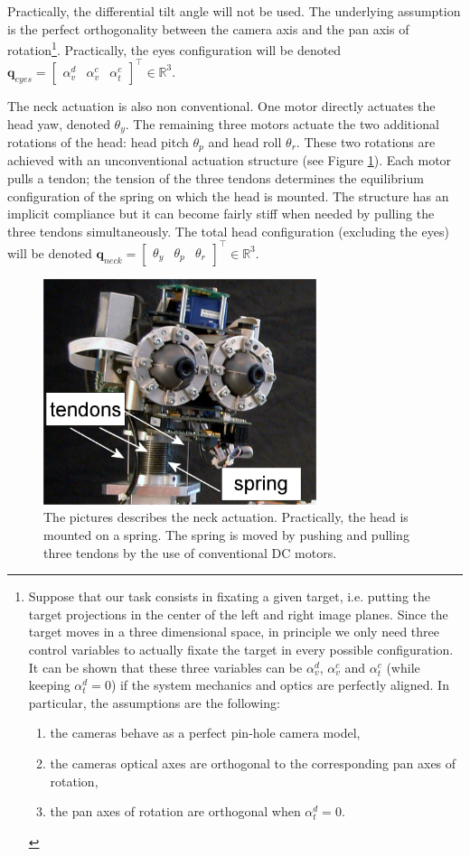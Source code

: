 Practically, the differential tilt angle will not be used. The underlying assumption is the perfect orthogonality between the camera axis and the pan axis of rotation\footnote{\samepage Suppose that our task consists in fixating a given target, i.e. putting the target projections in the center of the left and right image planes. Since the target moves in a three dimensional space, in principle we only need three control variables to actually fixate the target in every possible configuration. It can be shown that these three variables can be $\alpha_v^d$, $\alpha_v^c$ and $\alpha_t^c$ (while keeping $\alpha_t^d=0$) if the system mechanics and optics are perfectly aligned. In particular, the assumptions are the following:
\begin{enumerate}
\item the cameras behave as a perfect pin-hole camera model,
\item the cameras optical axes are orthogonal to the corresponding pan axes of rotation,
\item the pan axes of rotation are orthogonal when $\alpha_t^d=0$.
\end{enumerate}}. Practically, the eyes configuration will be denoted $\mathbf q_{eyes} = \begin{bmatrix} \alpha_v^d & \alpha_v^c & \alpha_t^c \end{bmatrix}^\top \in \mathbb R^3$.


The neck actuation is also non conventional. One motor directly actuates the head yaw, denoted $\theta_y$. The remaining three motors actuate the two additional rotations of the head: head pitch $\theta_p$ and head roll $\theta_r$. These two rotations are achieved with an unconventional actuation structure (see Figure \ref{Fig:Head}). Each motor pulls a tendon; the tension of the three tendons determines the equilibrium configuration of the spring on which the head is mounted. The structure has an implicit compliance but it can become fairly stiff when needed by pulling the three tendons simultaneously. The total head configuration (excluding the eyes) will be denoted $\mathbf q_{neck} = \begin{bmatrix} \theta_y & \theta_p & \theta_r \end{bmatrix}^\top \in \mathbb R^3$.

\begin{figure}
\centering
\includegraphics[width=80mm]{Figure/Head.jpg}
\caption{The pictures describes the neck actuation. Practically, the head is mounted on a spring. The spring is moved by pushing and pulling three tendons by the use of conventional DC motors.}
\label{Fig:Head}
\end{figure}

